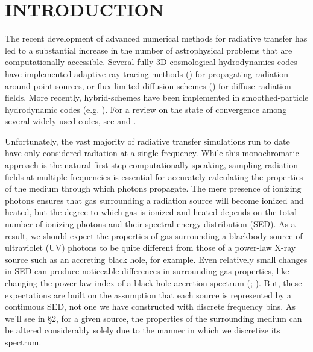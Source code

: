\documentclass[preprint2]{aastex}              %
\begin{document}
\section{INTRODUCTION}
The recent development of advanced numerical methods for radiative transfer has led to a substantial increase in the number of astrophysical problems that are computationally accessible.   Several fully 3D cosmological hydrodynamics codes have implemented adaptive ray-tracing methods (\cite{Abel2002}) for propagating radiation around point sources,  or flux-limited diffusion schemes (\cite{Reynolds2009}) for diffuse radiation fields.  More recently, hybrid-schemes have been implemented in smoothed-particle hydrodynamic codes (e.g. \cite{Petkova2011}).  For a review on the state of convergence among several widely used codes, see \cite{Iliev2006} and \cite{Iliev2009}.

Unfortunately, the vast majority of radiative transfer simulations run to date have only considered radiation at a single frequency.  While this monochromatic approach is the natural first step computationally-speaking, sampling radiation fields at multiple frequencies is essential for accurately calculating the properties of the medium through which photons propagate.  The mere presence of ionizing photons ensures that gas surrounding a radiation source will become ionized and heated, but the degree to which gas is ionized and heated depends on the total number of ionizing photons and their spectral energy distribution (SED).  As a result, we should expect the properties of gas surrounding a blackbody source of ultraviolet (UV) photons to be quite different from those of a power-law X-ray source such as an accreting black hole, for example.  Even relatively small changes in SED can produce noticeable differences in surrounding gas properties, like changing the power-law index of a black-hole accretion spectrum (\cite{Kuhlen2005}; \cite{Thomas2008}).  But, these expectations are built on the assumption that each source is represented by a continuous SED, not one we have constructed with \nnu discrete frequency bins.  As we'll see in \S2, for a given source, the properties of the surrounding medium can be altered considerably solely due to the manner in which we discretize its spectrum.
\end{document}
